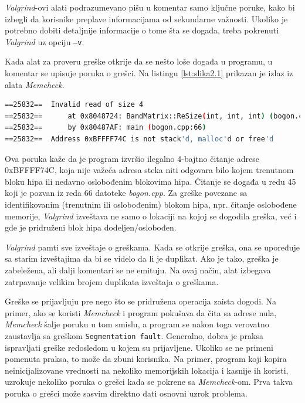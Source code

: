 \documentclass[12pt,oneside]{memoir}
\theoremstyle{plain}
\theoremstyle{definition}
\begin{document}
\textit{Valgrind}-ovi alati podrazumevano pišu u komentar samo ključne poruke, kako bi izbegli da korisnike preplave informacijama od sekundarne važnosti. Ukoliko je potrebno dobiti detaljnije informacije o tome šta se događa, treba pokrenuti \textit{Valgrind} uz opciju \texttt{–v}.

Kada alat za proveru greške otkrije da se nešto loše događa u programu, u komentar se upisuje poruka o grešci. Na listingu \ref{lst:slika2.1} prikazan je izlaz iz alata \textit{Memcheck}.

\begin{lstlisting}[style=terminal,caption={Primer izlaza alta \textit{Memcheck} \cite{ValgrindCore}}, label={lst:slika2.1},language={bash}]   
==25832==  Invalid read of size 4
==25832==      at 0x8048724: BandMatrix::ReSize(int, int, int) (bogon.cpp:45)
==25832==      by 0x80487AF: main (bogon.cpp:66)
==25832==  Address 0xBFFFF74C is not stack'd, malloc'd or free'd
\end{lstlisting}

Ova poruka kaže da je program izvršio ilegalno 4-bajtno čitanje adrese 0xBFFFF74C, koja nije važeća adresa steka niti odgovara bilo kojem trenutnom bloku hipa ili nedavno oslobođenim blokovima hipa. Čitanje se događa u redu 45 koji je pozvan iz reda 66 datoteke \textit{bogon.cpp}. Za greške povezane sa identifikovanim (trenutnim ili oslobođenim) blokom hipa, npr. čitanje oslobođene memorije, \textit{Valgrind} izveštava ne samo o lokaciji na kojoj se dogodila greška, već i gde je pridruženi blok hipa dodeljen/oslobođen.

\textit{Valgrind} pamti sve izveštaje o greškama. Kada se otkrije greška, ona se upoređuje sa starim izveštajima da bi se videlo da li je duplikat. Ako je tako, greška je zabeležena, ali dalji komentari se ne emituju. Na ovaj način, alat izbegava zatrpavanje velikim brojem duplikata izveštaja o greškama.  

Greške se prijavljuju pre nego što se pridružena operacija zaista dogodi. Na primer, ako se koristi \textit{Memcheck} i program pokušava da čita sa adrese nula, \textit{Memcheck} šalje poruku u tom smislu, a program se nakon toga verovatno zaustavlja sa greškom \texttt{Segmentation fault}. Generalno, dobra je praksa ispravljati greške redosledom u kojem su prijavljene. Ukoliko se ne primeni pomenuta praksa, to može da zbuni korisnika. Na primer, program koji kopira neinicijalizovane vrednosti na nekoliko memorijskih lokacija i kasnije ih koristi, uzrokuje nekoliko poruka o grešci kada se pokrene sa \textit{Memcheck}-om. Prva takva poruka o grešci može sasvim direktno dati osnovni uzrok problema. 
\end{document}
